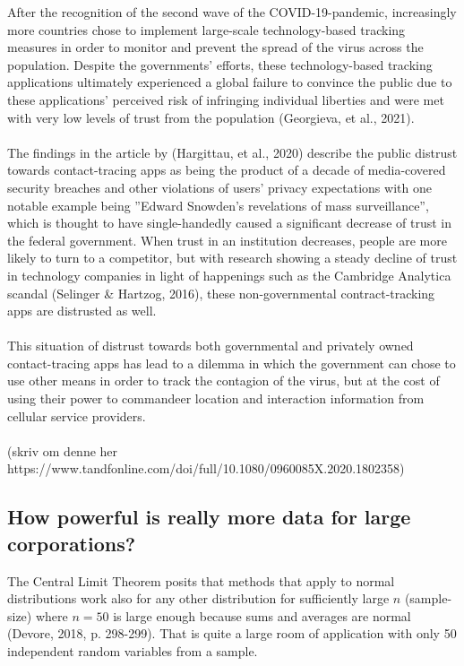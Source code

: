 \documentclass[11pt]{article}
\begin{document}
After the recognition of the second wave of the COVID-19-pandemic, increasingly more countries chose to implement large-scale technology-based tracking measures in order to monitor and prevent the spread of the virus across the population. Despite the governments’ efforts, these technology-based tracking applications ultimately experienced a global failure to convince the public due to these applications’ perceived risk of infringing individual liberties and were met with very low levels of trust from the population (Georgieva, et al., 2021).  \\ \\

The findings in the article by (Hargittau, et al., 2020) describe the public distrust towards contact-tracing apps as being the product of a decade of media-covered security breaches and other violations of users’ privacy expectations with one notable example being ”Edward Snowden’s revelations of mass surveillance”, which is thought to have single-handedly caused a significant decrease of trust in the federal government. When trust in an institution decreases, people are more likely to turn to a competitor, but with research showing a steady decline of trust in technology companies in light of happenings such as the Cambridge Analytica scandal (Selinger \& Hartzog, 2016), these non-governmental contract-tracking apps are distrusted as well. \\ \\

 

This situation of distrust towards both governmental and privately owned contact-tracing apps has lead to a dilemma in which the government can chose to use other means in order to track the contagion of the virus, but at the cost of using their power to commandeer location and interaction information from cellular service providers. \\ \\

(skriv om denne her https://www.tandfonline.com/doi/full/10.1080/0960085X.2020.1802358) 

\subsection{How powerful is really more data for large corporations?}
The Central Limit Theorem posits that methods that apply to normal distributions work also for any other distribution for sufficiently large $n$ (sample-size) where $n = 50$ is large enough because sums and averages are normal (Devore, 2018, p. 298-299). That is quite a large room of application with only 50 independent random variables from a sample. \\ \\
\end{document}
